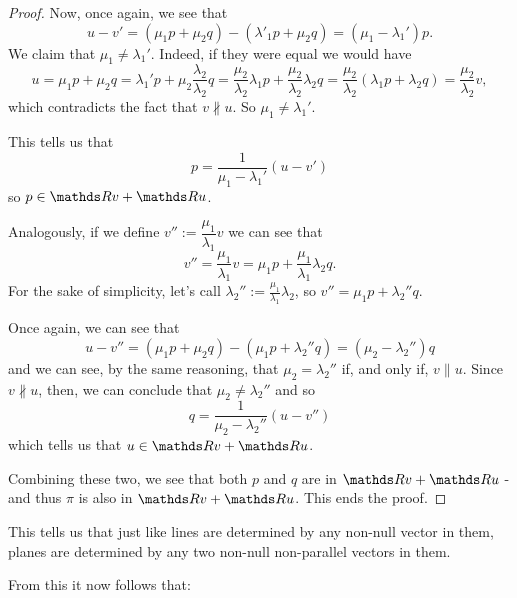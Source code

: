 \begin{proof}
	Now, once again, we see that
	\[u-v'=(\mu_1p+\mu_2q)-(\lambda'_1p+\mu_2q)=(\mu_1-\lambda_1')p.\]We claim that $\mu_1\neq \lambda_1'$. Indeed, if they were equal we would have
	\[u=\mu_1p+\mu_2q=\lambda_1'p+\mu_2\frac{\lambda_2}{\lambda_2}q=\frac{\mu_2}{\lambda_2}\lambda_1p+\frac{\mu_2}{\lambda_2}\lambda_2q=\frac{\mu_2}{\lambda_2}(\lambda_1p+\lambda_2q)=\frac{\mu_2}{\lambda_2}v,\]which contradicts the fact that $v\nparallel u$. So $\mu_1\neq\lambda_1'$.
	
	This tells us that
	\[p=\frac{1}{\mu_1-\lambda_1'}(u-v')\]so $p\in\R v+\R u$.
	
	\bigskip
	Analogously, if we define $v'':=\dfrac{\mu_1}{\lambda_1}v$ we can see that
	\[v''=\frac{\mu_1}{\lambda_1}v=\mu_1p+\frac{\mu_1}{\lambda_1}\lambda_2q.\]For the sake of simplicity, let's call $\lambda_2'':=\frac{\mu_1}{\lambda_1}\lambda_2$, so $v''=\mu_1p+\lambda_2''q$.
	
	Once again, we can see that
	\[u-v''=(\mu_1p+\mu_2q)-(\mu_1p+\lambda_2''q)=(\mu_2-\lambda_2'')q\]and we can see, by the same reasoning, that $\mu_2=\lambda_2''$ if, and only if, $v\parallel u$. Since $v\nparallel u$, then, we can conclude that $\mu_2\neq \lambda_2''$ and so
	\[q=\frac{1}{\mu_2-\lambda_2''}(u-v'')\]which tells us that $u\in\R v+\R u$.
	
	\bigskip
	Combining these two, we see that both $p$ and $q$ are in $\R v+\R u$ - and thus $\pi$ is also in $\R v+\R u$. This ends the proof.
\end{proof}

\begin{rmk}
	This tells us that just like lines are determined by any non-null vector in them, planes are determined by any two non-null non-parallel vectors in them.
\end{rmk}

From this it now follows that:

